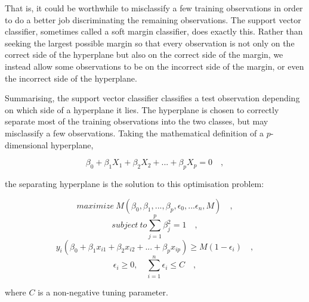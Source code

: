 \documentclass[a4paper, 12pt]{book}
\begin{document}
That is, it could be worthwhile to misclassify a few training observations
in order to do a better job discriminating the remaining observations.
The support vector classifier, sometimes called a soft margin classifier,
does exactly this. Rather than seeking the largest possible margin so that
every observation is not only on the correct side of the hyperplane but
also on the correct side of the margin, we instead allow some observations
to be on the incorrect side of the margin, or even the incorrect side of
the hyperplane.

Summarising, the support vector classifier classifies a test observation depending on
which side of a hyperplane it lies. The hyperplane is chosen to correctly
separate most of the training observations into the two classes, but may
misclassify a few observations. Taking the mathematical definition of a $p$-dimensional hyperplane, 
\begin{center}
\begin{equation}
\beta_{0} + \beta_{1}X_{1} + \beta_{2}X_{2} + ... + \beta_{p}X_{p} = 0 \quad,
\end{equation}
\end{center}
the separating hyperplane is the solution to this optimisation problem:
\begin{center}
\begin{equation}
maximize\ M (\beta_{0}, \beta_{1},...,\beta_{p}, \epsilon_{0}
,...\epsilon_{n}, M)\quad,
\end{equation}
\begin{equation}
subject\ to \sum_{j=1}^{p} \beta_{j}^2 = 1 \quad,
\end{equation}
\begin{equation}
y_{i}(\beta_{0} + \beta_{1}x_{i1} + \beta_{2}x_{i2} +...+ \beta_{p}x_{ip}) \geq M(1-\epsilon_{i}) \quad, 
\end{equation}
\begin{equation}
\epsilon_{i} \geq 0, \quad \sum_{i=1}^{n}\epsilon_{i} \leq C \quad, 
\end{equation}
\end{center}

where $C$ is a non-negative tuning parameter.


\end{document}
